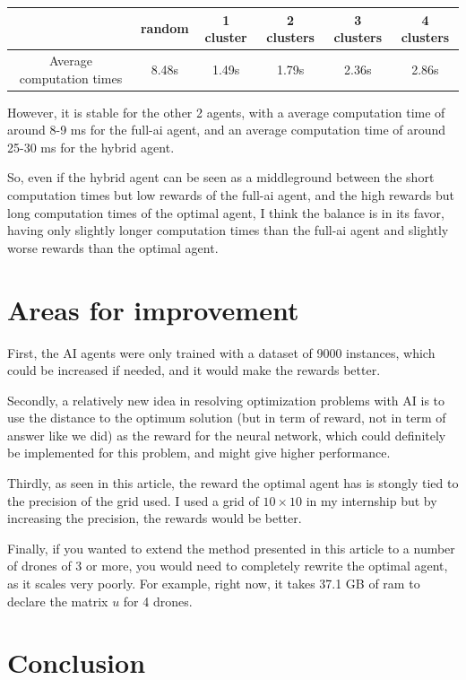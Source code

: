 \documentclass[letterpaper]{article}
\begin{document}
\begin{center}
    \begin{tabular}{|c|c|c|c|c|c|}
    \hline 
       & random & 1 cluster & 2 clusters & 3 clusters & 4 clusters \\ 
     \hline
     Average computation times & 8.48s & 1.49s & 1.79s & 2.36s & 2.86s \\  
     \hline
    \end{tabular}
\end{center}

However, it is stable for the other 2 agents, with a average computation time of around 8-9 ms for the full-ai agent,
and an average computation time of around 25-30 ms for the hybrid agent.

So, even if the hybrid agent can be seen as a middleground between the short computation times but low rewards of the full-ai agent,
and the high rewards but long computation times of the optimal agent, I think the balance is in its favor,
having only slightly longer computation times than the full-ai agent and slightly worse rewards than the optimal agent.


\section{Areas for improvement}

First, the AI agents were only trained with a dataset of 9000 instances, which could be increased if needed,
and it would make the rewards better.

Secondly, a relatively new idea in resolving optimization problems with AI is to use the distance to the optimum solution
(but in term of reward, not in term of answer like we did) as the reward for the neural network, which could definitely be implemented for this problem,
and might give higher performance.

Thirdly, as seen in this article\cite{main_article}, the reward the optimal agent has is stongly tied to the precision of the grid used.
I used a grid of $10 \times 10$ in my internship but by increasing the precision, the rewards would be better.

Finally, if you wanted to extend the method presented in this article to a number of drones of 3 or more, you would need to
completely rewrite the optimal agent, as it scales very poorly.
For example, right now, it takes 37.1 GB of ram to declare the matrix $u$ for 4 drones.


\section{Conclusion}
\end{document}

